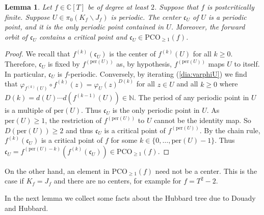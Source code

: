 \documentclass[12pt,oneside,a4]{amsart}
\newcommand{\IC}{\mathbb{C}}
\newcommand{\IN}{\mathbb{N}}
\newcounter{maincounter}
\numberwithin{maincounter}{section}
\numberwithin{equation}{section}
\newtheorem{lemma}[maincounter]{Lemma}
\newcommand{\ssm}{\smallsetminus}
\newcommand{\pco}{\mathrm{PCO}}
\begin{document}
\begin{lemma}
  \label{lem:centerprops}
  Let $f\in\IC[T]$ be of degree at least $2$. Suppose that $f$ is
  postcritically finite. Suppose $U\in \pi_0(K_f\ssm J_f)$ is periodic.
  The center $\mathfrak{c}_U$ of $U$ is a periodic point, and it is the
  only periodic point contained in $U$. Moreover, the forward orbit of
  $\mathfrak{c}_U$ contains a critical point and $\mathfrak{c}_U \in
  \pco_{\ge 1}(f)$.
\end{lemma}
\begin{proof}
  We recall that $f^{(k)}(\mathfrak{c}_U)$ is the center of
  $f^{(k)}(U)$ for all $k\ge 0$. Therefore, $\mathfrak{c}_U$ is fixed by
  $f^{(\mathrm{per}(U))}$ as, by hypothesis, $f^{(\mathrm{per}(U))}$
  maps $U$ to itself. In particular, $\mathfrak{c}_U$ is $f$-periodic.
  Conversely, by iterating (\ref{dia:varphiU}) we
  find that $\varphi_{f^{(k)}(U)}\circ f^{(k)}(z) = \varphi_U(z)^{D(k)}$ for
  all $z\in U$ and all $k\ge 0$ where $D(k) = d(U)\cdots
  d(f^{(k-1)}(U))\in\IN$. The period of any periodic point in $U$ is a
  multiple of $\mathrm{per}(U)$. Thus $\mathfrak{c}_U$ is the only
  periodic point in $U$. As $\mathrm{per}(U)\ge 1$, the restriction of
  $f^{(\mathrm{per}(U))}$ to $U$ cannot be the identity map. So
  $D(\mathrm{per}(U))\ge 2$ and thus $\mathfrak{c}_U$ is a critical point of
  $f^{(\mathrm{per}(U))}$. By the chain rule, $f^{(k)}(\mathfrak{c}_U)$
  is a critical point of $f$ for some $k\in
  \{0,\ldots,\mathrm{per}(U)-1\}$. Thus
  $\mathfrak{c}_U=f^{(\mathrm{per}(U)-k)}(f^{(k)}(\mathfrak{c}_U)) \in
  \pco_{\ge 1}(f)$.
\end{proof}

On the other hand,
an element in $\pco_{\ge 1}(f)$ need not be a center.
This is the case if $K_f=J_f$ and there are  no centers,
for example for $f=T^2-2$.

In the next lemma we collect some facts about the Hubbard
tree due to Douady and Hubbard.
\end{document}
